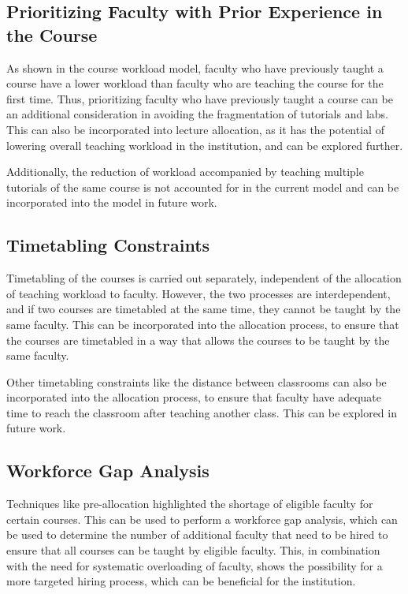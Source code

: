 \subsection{Prioritizing Faculty with Prior Experience in the Course}

As shown in the course workload model, faculty who have previously taught a course have a lower workload than faculty who are teaching the course for the first time. Thus, prioritizing faculty who have previously taught a course can be an additional consideration in avoiding the fragmentation of tutorials and labs. This can also be incorporated into lecture allocation, as it has the potential of lowering overall teaching workload in the institution, and can be explored further.

Additionally, the reduction of workload accompanied by teaching multiple tutorials of the same course is not accounted for in the current model and can be incorporated into the model in future work.

\subsection{Timetabling Constraints}

Timetabling of the courses is carried out separately, independent of the allocation of teaching workload to faculty. However, the two processes are interdependent, and if two courses are timetabled at the same time, they cannot be taught by the same faculty. This can be incorporated into the allocation process, to ensure that the courses are timetabled in a way that allows the courses to be taught by the same faculty.

Other timetabling constraints like the distance between classrooms can also be incorporated into the allocation process, to ensure that faculty have adequate time to reach the classroom after teaching another class. This can be explored in future work.

\subsection{Workforce Gap Analysis}

Techniques like pre-allocation highlighted the shortage of eligible faculty for certain courses. This can be used to perform a workforce gap analysis, which can be used to determine the number of additional faculty that need to be hired to ensure that all courses can be taught by eligible faculty. This, in combination with the need for systematic overloading of faculty, shows the possibility for a more targeted hiring process, which can be beneficial for the institution.
